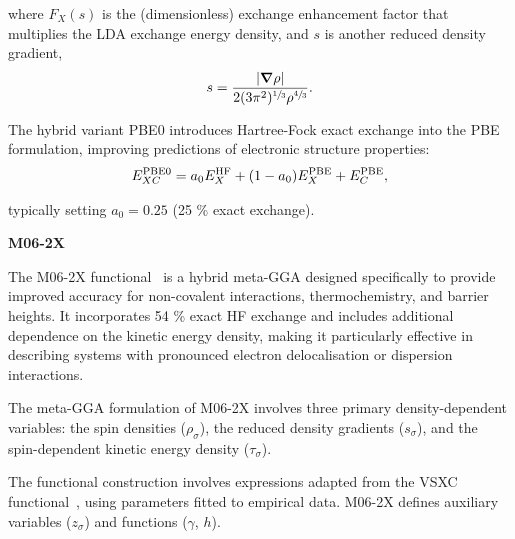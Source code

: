 \vspace{-0.7em}%
\noindent where $F_X(s)$ is the (dimensionless) exchange enhancement factor
that multiplies the \gls{LDA} exchange energy density, and $s$ is another
reduced density gradient,
%
\begin{align}
  s = \frac{|\boldsymbol{\nabla}\rho|}{2(3\pi^2)^{\sfrac{1}{3}}\rho^{\sfrac{4}{3}}}.
\end{align}

\vspace{-0.7em}%
The hybrid variant PBE0 introduces Hartree-Fock exact exchange into the PBE
formulation, improving predictions of electronic structure properties:
%
\begin{align}
  E_{XC}^{\mathrm{PBE0}} = a_0E_X^{\mathrm{HF}} + (1-a_0)E_X^{\mathrm{PBE}} + E_C^{\mathrm{PBE}},
\end{align}

\noindent typically setting $a_0 = 0.25$ (25 \% exact exchange).

\newpage
\noindent \textbf{M06-2X}

\noindent The M06-2X functional~\cite{Zhao2007} is a hybrid meta-GGA designed
specifically to provide improved accuracy for non-covalent interactions,
thermochemistry, and barrier heights. It incorporates 54 \% exact
\gls{HF} exchange and includes additional dependence on the kinetic energy
density, making it particularly effective in describing systems with pronounced
electron delocalisation or dispersion interactions.

The meta-GGA formulation of M06-2X involves three primary density-dependent
variables: the spin densities ($\rho_\sigma$), the reduced density gradients
($s_\sigma$), and the spin-dependent kinetic energy density ($\tau_\sigma$).


The functional construction involves expressions adapted from the VSXC
functional~\cite{VanVoorhis1998}, using parameters fitted to empirical data.
M06-2X defines auxiliary variables ($z_\sigma$) and functions ($\gamma$, $h$).


